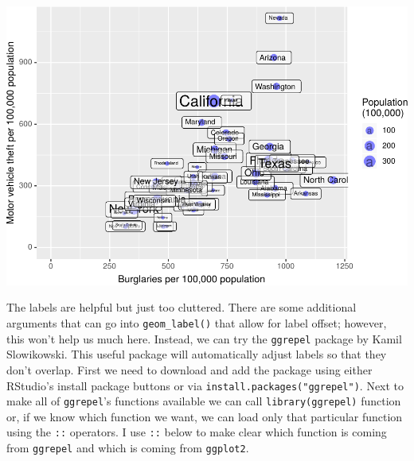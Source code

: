 \documentclass[]{krantz}
\begin{document}
\includegraphics{bookdown_files/figure-latex/unnamed-chunk-70-1.pdf}

The labels are helpful but just too cluttered. There are some additional arguments that can go into \texttt{geom\_label()} that allow for label offset; however, this won't help us much here. Instead, we can try the \texttt{ggrepel} package by Kamil Slowikowski. This useful package will automatically adjust labels so that they don't overlap. First we need to download and add the package using either RStudio's install package buttons or via \texttt{install.packages("ggrepel")}. Next to make all of \texttt{ggrepel}'s functions available we can call \texttt{library(ggrepel)} function or, if we know which function we want, we can load only that particular function using the \texttt{::} operators. I use \texttt{::} below to make clear which function is coming from \texttt{ggrepel} and which is coming from \texttt{ggplot2}.
\end{document}
